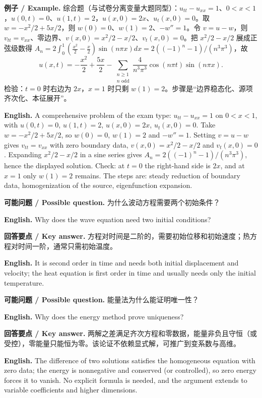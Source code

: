 \documentclass[UTF8,11pt,a4paper]{ctexart}
\newcommand{\EN}[1]{\par\noindent \textbf{English.} #1\par}
\newcommand{\EX}[2]{\par\noindent \textbf{例子 / Example.} #1\par\EN{#2}}
\newcommand{\ASK}[4]{\par\noindent \textbf{可能问题 / Possible question.} #1\par\EN{#2}\noindent \textbf{回答要点 / Key answer.} #3\par\EN{#4}\medskip}
\begin{document}
\EX{综合题（与试卷分离变量大题同型）：$u_{tt}-u_{xx}=1$、$0<x<1$，$u(0,t)=0$、$u(1,t)=2$，$u(x,0)=2x$、$u_t(x,0)=0$。取 $w=-x^2/2+5x/2$，则 $w(0)=0$、$w(1)=2$、$-w''=1$。令 $v=u-w$，则 $v_{tt}=v_{xx}$、零边界、$v(x,0)=x^2/2-x/2$、$v_t(x,0)=0$。把 $x^2/2-x/2$ 展成正弦级数得 $A_n=2\int_0^1(\frac{x^2}{2}-\frac{x}{2})\sin(n\pi x)dx=2((-1)^n-1)/(n^3\pi^3)$，故
\[
u(x,t)=-\frac{x^2}{2}+\frac{5x}{2}-\sum_{\substack{n\ge1\\n\text{ odd}}}\frac{4}{n^3\pi^3}\cos(n\pi t)\sin(n\pi x).
\]
检验：$t=0$ 时右边为 $2x$，$x=1$ 时只剩 $w(1)=2$。步骤是“边界稳态化、源项齐次化、本征展开”。}{A comprehensive problem of the exam type: $u_{tt}-u_{xx}=1$ on $0<x<1$, with $u(0,t)=0$, $u(1,t)=2$, $u(x,0)=2x$, $u_t(x,0)=0$. Take $w=-x^2/2+5x/2$, so $w(0)=0$, $w(1)=2$ and $-w''=1$. Setting $v=u-w$ gives $v_{tt}=v_{xx}$ with zero boundary data, $v(x,0)=x^2/2-x/2$ and $v_t(x,0)=0$. Expanding $x^2/2-x/2$ in a sine series gives $A_n=2((-1)^n-1)/(n^3\pi^3)$, hence the displayed solution. Check: at $t=0$ the right-hand side is $2x$, and at $x=1$ only $w(1)=2$ remains. The steps are: steady reduction of boundary data, homogenization of the source, eigenfunction expansion.}
\ASK{为什么波动方程需要两个初始条件？}{Why does the wave equation need two initial conditions?}{方程对时间是二阶的，需要初始位移和初始速度；热方程对时间一阶，通常只需初始温度。}{It is second order in time and needs both initial displacement and velocity; the heat equation is first order in time and usually needs only the initial temperature.}
\ASK{能量法为什么能证明唯一性？}{Why does the energy method prove uniqueness?}{两解之差满足齐次方程和零数据，能量非负且守恒（或受控），零能量只能恒为零。该论证不依赖显式解，可推广到变系数与高维。}{The difference of two solutions satisfies the homogeneous equation with zero data; the energy is nonnegative and conserved (or controlled), so zero energy forces it to vanish. No explicit formula is needed, and the argument extends to variable coefficients and higher dimensions.}
\end{document}
